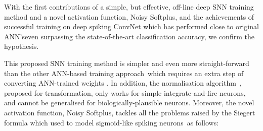 With the first contributions of a simple, but effective, off-line deep SNN training method and a novel activation function, Noisy Softplus, and the achievements of successful training on \DIFdelbegin {}\DIFdelend \DIFaddbegin {}\DIFaddend deep spiking ConvNet which has performed close to \DIFaddbegin {}\DIFaddend original ANN's\DIFaddbegin \DIFadd{, }\DIFaddend even surpassing the state-of-the-art classification accuracy, we confirm the hypothesis. 

This proposed SNN training method is simpler and even more straight-forward than the other ANN-based training approach~\DIFdelbegin {}\DIFdelend \DIFaddbegin {}\DIFaddend which requires an extra step of converting ANN-trained weights \DIFdelbegin {}\DIFdelend \DIFaddbegin {}\DIFaddend .
In addition, the normalisation algorithm~\DIFdelbegin {}\DIFdelend \DIFaddbegin {}\DIFaddend , proposed for \DIFdelbegin {}\DIFdelend \DIFaddbegin {}\DIFaddend transformation, only works for simple integrate-and-fire neurons, and cannot be generalised for biologically-plausible neurons.
Moreover, the novel activation function, Noisy Softplus, tackles all the problems raised by the Siegert formula which \DIFaddbegin {}\DIFaddend used to model sigmoid-like spiking neurons~\DIFdelbegin {}\DIFdelend \DIFaddbegin {}\DIFaddend as follows: 
